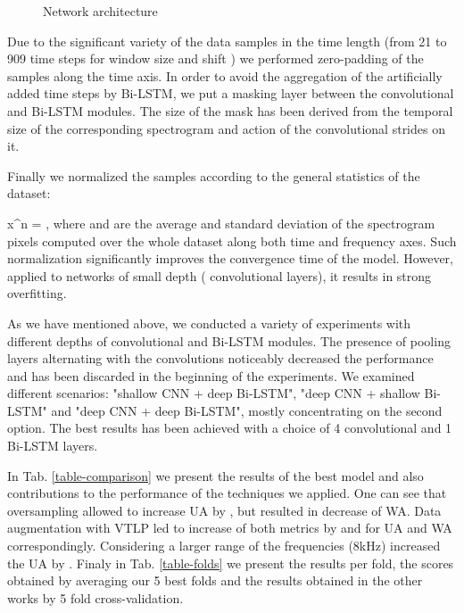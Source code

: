\documentclass[a4paper]{article}
\newcommand{\beq}{}
\begin{document}
\begin{figure*}
     \centering
     \caption{Network architecture}
     \label{fig:archi}
\end{figure*}

Due to the significant variety of the data samples in the time length (from 21 to 909 time steps for window size  and shift ) we performed zero-padding of 
the samples along the time axis. In order to avoid the aggregation of the artificially added time steps by Bi-LSTM, we put a masking layer between the 
convolutional and Bi-LSTM modules. The size of the mask has been derived from the temporal size of the corresponding spectrogram and action of the convolutional strides on it.   

Finally we normalized the samples according to the general statistics of the dataset:
\beq
x^n = ,
\eeq
where  and  are the average and standard deviation of the spectrogram pixels computed over the whole dataset along both time and frequency axes. 
Such normalization significantly improves the convergence time of the model. However, applied to networks of small depth ( convolutional layers), 
it results in strong overfitting.

As we have mentioned above, we conducted a variety of experiments with different depths of convolutional and Bi-LSTM modules. The presence of pooling layers alternating 
with the convolutions noticeably decreased the performance and has been discarded in the beginning of the experiments. We examined different scenarios: 
"shallow CNN + deep Bi-LSTM", "deep CNN + shallow Bi-LSTM" and "deep CNN + deep Bi-LSTM", mostly concentrating on the second option. The best results has been achieved with a choice of 4 convolutional and 1 Bi-LSTM layers. 

In Tab. \ref{table-comparison} we present the results of the best model and also contributions to the performance of the techniques we applied. One can see that 
oversampling allowed to increase UA by , but resulted in  decrease of WA. Data augmentation with VTLP led to increase of both metrics by  and  
for UA and WA correspondingly. Considering a larger range of the frequencies (8kHz) increased the UA by . Finaly in Tab. \ref{table-folds} we present the results per fold, the scores obtained by averaging our 5 best folds and the results obtained in the other works by 5 fold cross-validation.
\end{document}
